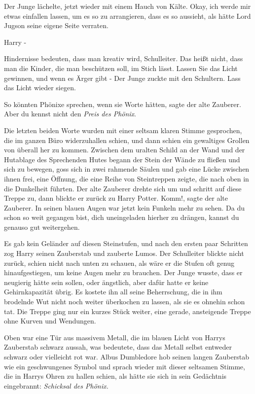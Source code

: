 Der Junge lächelte, jetzt wieder mit einem Hauch von Kälte. \glqq Okay, ich
werde mir etwas einfallen lassen, um es so zu arrangieren, dass es so aussieht,
als hätte Lord Jugson seine eigene Seite verraten.\grqq{}

\glqq Harry -\grqq{}

\glqq Hindernisse bedeuten, dass man kreativ wird, Schulleiter. Das heißt nicht,
dass man die Kinder, die man beschützen soll, im Stich lässt. Lassen Sie das
Licht gewinnen, und wenn es Ärger gibt -\grqq{} Der Junge zuckte mit den
Schultern. \glqq Lass das Licht wieder siegen.\grqq{}

\glqq So könnten Phönixe sprechen, wenn sie Worte hätten\grqq{}, sagte der alte
Zauberer. \glqq Aber du kennst nicht den \emph{Preis des Phönix}.\grqq{}

Die letzten beiden Worte wurden mit einer seltsam klaren Stimme gesprochen, die
im ganzen Büro widerzuhallen schien, und dann schien ein gewaltiges Grollen von
überall her zu kommen. Zwischen dem uralten Schild an der Wand und der Hutablage
des Sprechenden Hutes begann der Stein der Wände zu fließen und sich zu bewegen,
goss sich in zwei rahmende Säulen und gab eine Lücke zwischen ihnen frei, eine
Öffnung, die eine Reihe von Steintreppen zeigte, die nach oben in die Dunkelheit
führten. Der alte Zauberer drehte sich um und schritt auf diese Treppe zu, dann
blickte er zurück zu Harry Potter. \glqq Komm!\grqq{}, sagte der alte Zauberer.
In seinen blauen Augen war jetzt kein Funkeln mehr zu sehen. \glqq Da du schon
so weit gegangen bist, dich uneingeladen hierher zu drängen, kannst du genauso
gut weitergehen.\grqq{}

Es gab kein Geländer auf diesen Steinstufen, und nach den ersten paar Schritten
zog Harry seinen Zauberstab und zauberte Lumos. Der Schulleiter blickte nicht
zurück, schien nicht nach unten zu schauen, als wäre er die Stufen oft genug
hinaufgestiegen, um keine Augen mehr zu brauchen. Der Junge wusste, dass er
neugierig hätte sein sollen, oder ängstlich, aber dafür hatte er keine
Gehirnkapazität übrig. Es kostete ihn all seine Beherrschung, die in ihm
brodelnde Wut nicht noch weiter überkochen zu lassen, als sie es ohnehin schon
tat. Die Treppe ging nur ein kurzes Stück weiter, eine gerade, ansteigende
Treppe ohne Kurven und Wendungen.

Oben war eine Tür aus massivem Metall, die im blauen Licht von Harrys Zauberstab
schwarz aussah, was bedeutete, dass das Metall selbst entweder schwarz oder
vielleicht rot war. Albus Dumbledore hob seinen langen Zauberstab wie ein
geschwungenes Symbol und sprach wieder mit dieser seltsamen Stimme, die in
Harrys Ohren zu hallen schien, als hätte sie sich in sein Gedächtnis
eingebrannt: \glqq \emph{Schicksal des Phönix.}\grqq{}

